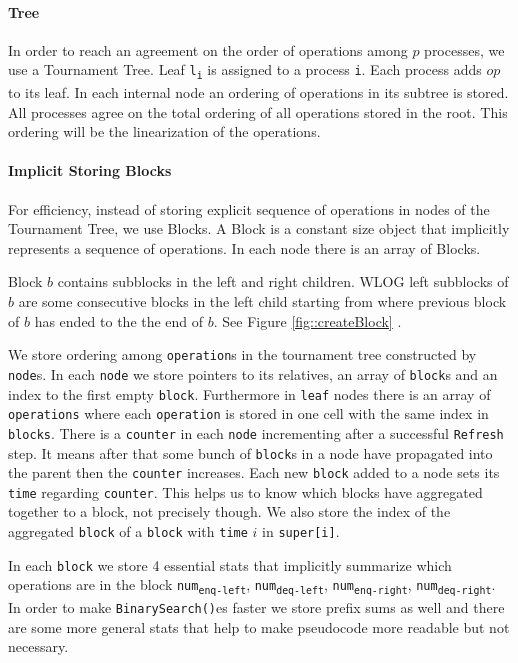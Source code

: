 \documentclass[10pt]{article}
\theoremstyle{definition}
\begin{document}
\paragraph{Tree}
In order to reach an agreement on the order of operations among $p$ processes, we use a Tournament Tree. Leaf \texttt{l\textsubscript{i}} is assigned to a process \texttt{i}. Each process adds $op$ to its leaf. In each internal node an ordering of operations in its subtree is stored. All processes agree on the total ordering of all operations stored in the root. This ordering will be the linearization of the operations.
\paragraph{Implicit Storing Blocks}
For efficiency, instead of storing explicit sequence of operations in nodes of the Tournament Tree, we use Blocks. A Block is a constant size object that implicitly represents a sequence of operations. In each node there is an array of Blocks.

Block $b$ contains subblocks in the left and right children. WLOG left subblocks of $b$ are some consecutive blocks in the left child starting from where previous block of $b$ has ended to the the end of $b$. See Figure \ref{fig::createBlock} .

We store ordering among \texttt{operation}s in the tournament tree constructed by \texttt{node}s. In each \texttt{node} we store pointers to its relatives, an array of \texttt{block}s and an index to the first empty \texttt{block}. Furthermore in \texttt{leaf} nodes there is an array of \texttt{operations} where each \texttt{operation} is stored in one cell with the same index in \texttt{blocks}. There is a \texttt{counter} in each \texttt{node} incrementing after a successful \texttt{Refresh} step. It means after that some bunch of \texttt{block}s in a node have propagated into the parent then the \texttt{counter} increases. Each new \texttt{block} added to a node sets its \texttt{time} regarding \texttt{counter}. This helps us to know which blocks have aggregated together to a block, not precisely though. We also store the index of the aggregated \texttt{block} of a \texttt{block} with \texttt{time} $i$ in \texttt{super[i]}. 

In each \texttt{block} we store 4 essential stats that implicitly summarize which operations are in the block \texttt{num\textsubscript{enq-left}}, \texttt{num\textsubscript{deq-left}}, \texttt{num\textsubscript{enq-right}}, \texttt{num\textsubscript{deq-right}}. In order to make \texttt{BinarySearch()}es faster we store prefix sums as well and there are some more general stats that help to make pseudocode more readable but not necessary.
\end{document}
